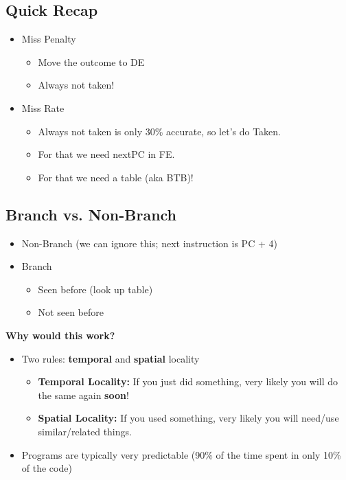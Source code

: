 \documentclass[10pt]{article}
\begin{document}
\subsection*{Quick Recap}
\begin{itemize}
    \item Miss Penalty
    \begin{itemize}
        \item Move the outcome to DE
        \item Always not taken!
    \end{itemize}
    \item Miss Rate
    \begin{itemize}
        \item Always not taken is only 30\% accurate, so let's do Taken.
        \item For that we need nextPC in FE.
        \item For that we need a table (aka BTB)!
    \end{itemize}
\end{itemize}

\subsection*{Branch vs. Non-Branch}
\begin{itemize}
    \item Non-Branch (we can ignore this; next instruction is PC + 4)
    \item Branch
    \begin{itemize}
        \item Seen before (look up table)
        \item Not seen before
    \end{itemize}
\end{itemize}
\textbf{Why would this work?}\\
\begin{itemize}
    \item Two rules: \textbf{temporal} and \textbf{spatial} locality
    \begin{itemize}
        \item \textbf{Temporal Locality:} If you just did something, very likely you will do the same again \textbf{soon}!
        \item \textbf{Spatial Locality:} If you used something, very likely you will need/use similar/related things.
    \end{itemize}
    \item Programs are typically very predictable (90\% of the time spent in only 10\% of the code)
\end{itemize}
\end{document}
